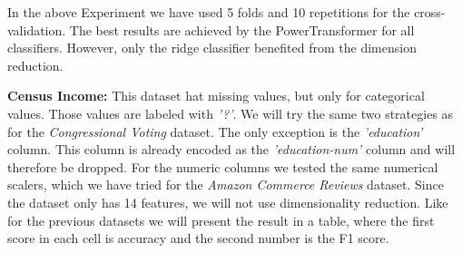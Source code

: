 \documentclass[a4paper,12pt]{article}
\begin{document}
In the above Experiment we have used 5 folds and 10 repetitions for the cross-validation. The best results are achieved by the PowerTransformer for all classifiers. However, only the ridge classifier benefited from the
dimension reduction.



 \textbf{Census Income:} This dataset hat missing values, but only for categorical values.
 Those values are labeled with \textit{'?'}. We will try the same two strategies as for the \textit{Congressional Voting} dataset.
 The only exception is the \textit{'education'} column. This column is already encoded as the
 \textit{'education-num'} column and will therefore be dropped. For the numeric columns 
 we tested the same numerical scalers, which we have tried for the 
 \textit{Amazon Commerce Reviews} dataset. Since the dataset only has 14 features,
we will not use dimensionality reduction. Like for the previous
datasets we will present the result in a table, where the first score in each cell is accuracy and the second
number is the F1 score.
\end{document}
